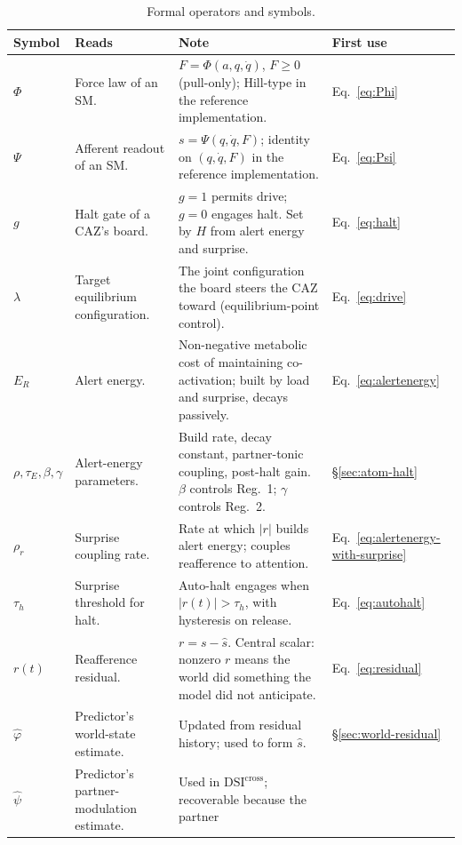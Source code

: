 \documentclass{article}
\begin{document}
\begin{table}[h]
\centering
\small
\caption{Formal operators and symbols.}
\label{tab:gloss-formal}
\begin{tabularx}{\linewidth}{@{}l l X l@{}}
\toprule
\textbf{Symbol} & \textbf{Reads} & \textbf{Note} & \textbf{First use} \\
\midrule
$\Phi$ & Force law of an SM. &
$F=\Phi(a,q,\dot q)$, $F\geq 0$ (pull-only); Hill-type in the reference
implementation. & Eq.~\eqref{eq:Phi} \\
\addlinespace[2pt]
$\Psi$ & Afferent readout of an SM. &
$s=\Psi(q,\dot q,F)$; identity on $(q,\dot q,F)$ in the reference
implementation. & Eq.~\eqref{eq:Psi} \\
\addlinespace[2pt]
$g$ & Halt gate of a CAZ's board. &
$g=1$ permits drive; $g=0$ engages halt. Set by $H$ from alert energy and
surprise. & Eq.~\eqref{eq:halt} \\
\addlinespace[2pt]
$\lambda$ & Target equilibrium configuration. &
The joint configuration the board steers the CAZ toward (equilibrium-point
control). & Eq.~\eqref{eq:drive} \\
\addlinespace[2pt]
$E_R$ & Alert energy. &
Non-negative metabolic cost of maintaining co-activation; built by load
and surprise, decays passively. & Eq.~\eqref{eq:alertenergy} \\
\addlinespace[2pt]
$\rho,\tau_E,\beta,\gamma$ & Alert-energy parameters. &
Build rate, decay constant, partner-tonic coupling, post-halt gain.
$\beta$ controls Reg.~1; $\gamma$ controls Reg.~2. & \S\ref{sec:atom-halt} \\
\addlinespace[2pt]
$\rho_r$ & Surprise coupling rate. &
Rate at which $|r|$ builds alert energy; couples reafference to attention.
& Eq.~\eqref{eq:alertenergy-with-surprise} \\
\addlinespace[2pt]
$\tau_h$ & Surprise threshold for halt. &
Auto-halt engages when $|r(t)|>\tau_h$, with hysteresis on release.
& Eq.~\eqref{eq:autohalt} \\
\addlinespace[2pt]
$r(t)$ & Reafference residual. &
$r=s-\hat s$. Central scalar: nonzero $r$ means the world did something the
model did not anticipate. & Eq.~\eqref{eq:residual} \\
\addlinespace[2pt]
$\hat\varphi$ & Predictor's world-state estimate. &
Updated from residual history; used to form $\hat s$.
& \S\ref{sec:world-residual} \\
\addlinespace[2pt]
$\hat\psi$ & Predictor's partner-modulation estimate. &
Used in $\mathrm{DSI}^{\mathrm{cross}}$; recoverable because the partner

\end{tabularx}
\end{table}
\end{document}

